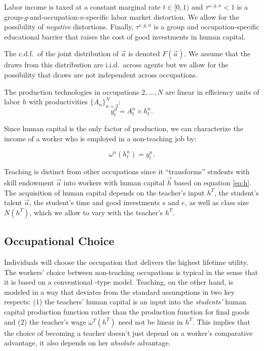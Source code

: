 \documentclass[onehalfspacing,11pt]{article}
\begin{document}
Labor income is taxed at a constant marginal rate $t \in [0,1)$ and $\tau^{\omega,g,n} < 1$ is a group-$g$-and-occupation-$n$-specific labor market distortion. We allow for the possibility of {\it negative} distortions. Finally, $\tau^{e,g,n}$ is a group and occupation-specific educational barrier that raises the cost of good investments in human capital.


The c.d.f.~of the joint distribution of $\vec{a}$ is denoted $F \left( \vec{a} \right)$. We assume that the draws from this distribution are i.i.d.~across agents but we allow for the possibility that draws are not independent across occupations.

The production technologies in occupations $2,\ldots,N$ are linear in efficiency units of labor $h$ with productivities $\{A_n\}_{n=2}^N$:
\begin{equation}
\label{ }
y_t^n = A_t^n \times h_t^n.
\end{equation}

Since human capital is the only factor of production, we can characterize the income of a worker who is employed in a non-teaching job by:

\begin{equation}
\label{ }
\omega^n \left( h_t^n \right) = y_t^n.
\end{equation}

Teaching is distinct from other occupations since it ``transforms'' students with skill endowment $\vec{a}$ into workers with human capital $\vec{h}$ based on equation \eqref{eq:h}. The acquisition of human capital depends on the teacher's input $h^T$, the student's talent $\vec{a}$, the student's time and good investments $s$ and $e$, as well as class size $N(h^T)$, which we allow to vary with the teacher's $h^T$.

\subsection{Occupational Choice}

Individuals will choose the occupation that delivers the highest lifetime utility. The workers' choice between non-teaching occupations is typical in the sense that it is based on a conventional \cite{Roy:1951}-type model. Teaching, on the other hand, is modeled in a way that deviates from the standard assumptions in two key respects: (1) the teachers' human capital is an input into the {\it students'} human capital production function rather than the production function for final goods and (2) the teacher's wage $\omega^T \left( h^T \right)$ need not be linear in $h^T$. This implies that the choice of becoming a teacher doesn't just depend on a worker's comparative advantage, it also depends on her {\it absolute} advantage.
\end{document}

